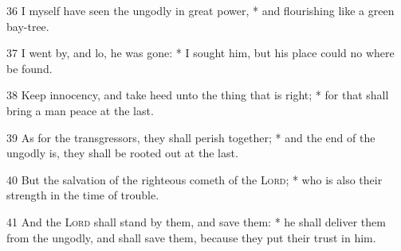 36 I myself have seen the ungodly in great power, * and flourishing like a green bay-tree.\par
37 I went by, and lo, he was gone: * I sought him, but his place could no where be found.\par
38 Keep innocency, and take heed unto the thing that is right; * for that shall bring a man peace at the last.\par
39 As for the transgressors, they shall perish together; * and the end of the ungodly is, they shall be rooted out at the last.\par
40 But the salvation of the righteous cometh of the {\textsc{Lord}}; * who is also their strength in the time of trouble.\par
41 And the {\textsc{Lord}} shall stand by them, and save them: * he shall deliver them from the ungodly, and shall save them, because they put their trust in him.
